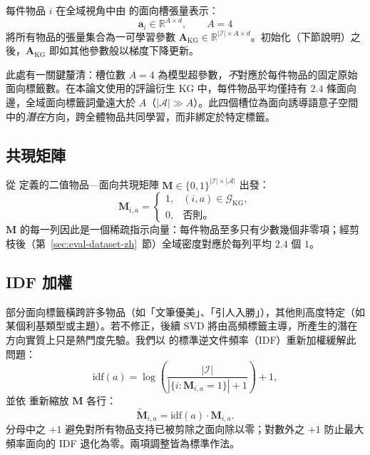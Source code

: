 每件物品 $i$ 在全域視角中由  的面向槽張量表示：
\begin{equation}
\label{eq:aspect-slots-def-zh}
\mathbf{a}_i \in \mathbb{R}^{A \times d}, \qquad A = 4
\end{equation}
將所有物品的張量集合為一可學習參數 $\mathbf{A}_{\mathrm{KG}} \in \mathbb{R}^{|\mathcal{I}| \times A \times d}$。初始化（下節說明）之後，$\mathbf{A}_{\mathrm{KG}}$ 即如其他參數般以梯度下降更新。

此處有一關鍵釐清：槽位數 $A = 4$ 為模型超參數，\emph{不}對應於每件物品的固定原始面向標籤數。在本論文使用的評論衍生 KG 中，每件物品平均僅持有 $2.4$ 條面向邊，全域面向標籤詞彙遠大於 $A$（$|\mathcal{A}| \gg A$）。此四個槽位為面向誘導語意子空間中的\emph{潛在}方向，跨全體物品共同學習，而非綁定於特定標籤。

\subsection{共現矩陣}
\label{sec:kgsvd-cooc-zh}

從  定義的二值物品—面向共現矩陣 $\mathbf{M} \in \{0,1\}^{|\mathcal{I}| \times |\mathcal{A}|}$ 出發：
\begin{equation}
\label{eq:cooc-zh}
\mathbf{M}_{i,a} = \begin{cases} 1, & (i, a) \in \mathcal{G}_{\mathrm{KG}}, \\ 0, & \text{否則}。 \end{cases}
\end{equation}
$\mathbf{M}$ 的每一列因此是一個稀疏指示向量：每件物品至多只有少數幾個非零項；經剪枝後（第~\ref{sec:eval-dataset-zh}~節）全域密度對應於每列平均 $2.4$ 個 $1$。

\subsection{IDF 加權}
\label{sec:kgsvd-idf-zh}

部分面向標籤橫跨許多物品（如「文筆優美」、「引人入勝」），其他則高度特定（如某個利基類型或主題）。若不修正，後續 SVD 將由高頻標籤主導，所產生的潛在方向實質上只是熱門度先驗。我們以  的標準逆文件頻率（IDF）重新加權緩解此問題：
\begin{equation}
\label{eq:idf-zh}
\mathrm{idf}(a) = \log\!\left( \frac{|\mathcal{I}|}{|\{i : \mathbf{M}_{i,a} = 1\}| + 1} \right) + 1,
\end{equation}
並依  重新縮放 $\mathbf{M}$ 各行：
\begin{equation}
\label{eq:idf-rescale-zh}
\tilde{\mathbf{M}}_{i,a} = \mathrm{idf}(a) \cdot \mathbf{M}_{i,a}.
\end{equation}
分母中之 $+1$ 避免對所有物品支持已被剪除之面向除以零；對數外之 $+1$ 防止最大頻率面向的 IDF 退化為零。兩項調整皆為標準作法。

